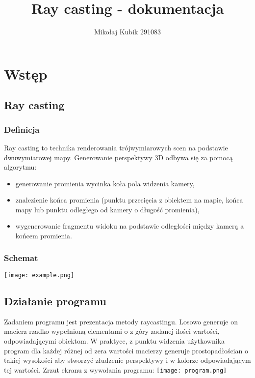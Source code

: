 \documentclass[11pt, a4paper]{article}
\title{Ray casting - dokumentacja}
\author{Mikołaj Kubik 291083}
\begin{document}
\maketitle
\tableofcontents
\newpage

\section{Wstęp}

\subsection{Ray casting}

\subsubsection{Definicja}
Ray casting to technika renderowania trójwymiarowych scen na podstawie dwuwymiarowej mapy. Generowanie perspektywy 3D odbywa się za pomocą algorytmu:
\begin{itemize}
    \item generowanie promienia wycinka koła pola widzenia kamery,
    \item znalezienie końca promienia (punktu przecięcia z obiektem na mapie, końca mapy lub punktu odległego od kamery o długość promienia),
    \item wygenerowanie fragmentu widoku na podstawie odległości między kamerą a końcem promienia.
\end{itemize}

\subsubsection{Schemat}
\texttt{[image: example.png]}

\subsection{Działanie programu}
Zadaniem programu jest prezentacja metody raycastingu. Losowo generuje on macierz rzadko wypełnioną elementami o 
z góry zadanej ilości wartości, odpowiadającymi obiektom. W praktyce, z punktu widzenia użytkownika program dla każdej różnej od zera 
wartości macierzy generuje prostopadłościan o takiej wysokości aby stworzyć złudzenie perspektywy i w kolorze odpowiadającym tej wartości.
\newline
\newline
Zrzut ekranu z wywołania programu:
\newline
\texttt{[image: program.png]}
\end{document}
